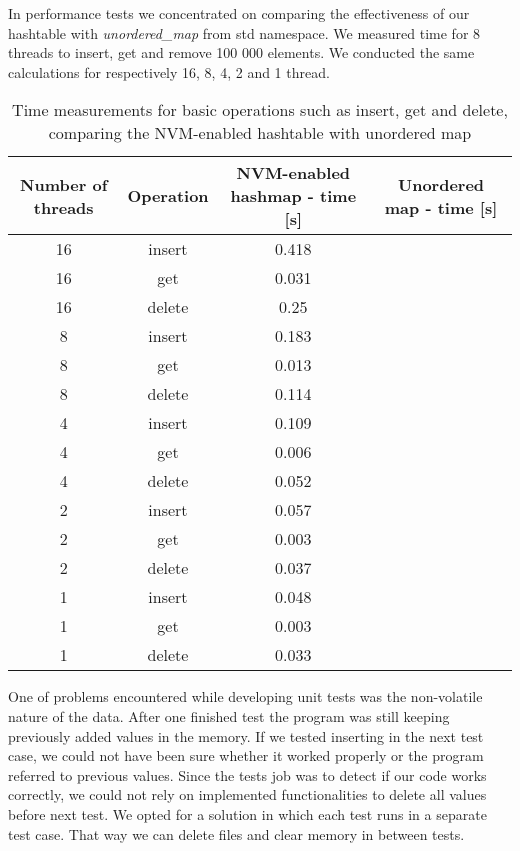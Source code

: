     In performance tests we concentrated on comparing the effectiveness of our hashtable with \textit{unordered\_map} from std namespace. We measured time for 8 threads to insert, get and remove 100 000 elements. We conducted the same calculations for respectively 16, 8, 4, 2 and 1 thread. 

    \begin{table}[h]
    \caption{Time measurements for basic operations such as insert, get and delete, comparing the NVM-enabled hashtable with unordered map}\label{tab:tabela}
    \centering\footnotesize%
        \begin{tabular}{|c|c|c|c|} 
            \toprule
            Number of threads & Operation & NVM-enabled hashmap - time [s] & Unordered map - time [s] \\
            \midrule
            16 & insert & 0.418 & \\
            16 & get & 0.031 &    \\
            16 & delete & 0.25 &  \\
            \midrule
            8 & insert & 0.183 &  \\
            8 & get & 0.013 &     \\
            8 & delete & 0.114 &  \\
            \midrule
            4 & insert & 0.109 &  \\
            4 & get & 0.006 &     \\
            4 & delete & 0.052 &  \\
            \midrule
            2 & insert & 0.057 &  \\
            2 & get & 0.003 &     \\
            2 & delete & 0.037 &  \\
            \midrule
            1 & insert & 0.048 &  \\
            1 & get & 0.003 &     \\
            1 & delete & 0.033 &  \\
            \bottomrule
        \end{tabular}
    \end{table}

    One of problems encountered while developing unit tests was the non-volatile nature of the data. After one finished test the program was still keeping previously added values in the memory. If we tested inserting in the next test case, we could not have been sure whether it worked properly or the program referred to previous values. Since the tests job was to detect if our code works correctly, we could not rely on implemented functionalities to delete all values before next test. We opted for a solution in which each test runs in a separate test case. That way we can delete files and clear memory in between tests.

